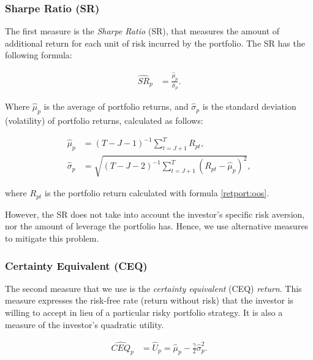 \documentclass[12pt,oneside,a4paper]{memoir}
\begin{document}
\subsubsection*{Sharpe Ratio (SR)} 

The first measure is the \textit{Sharpe Ratio} (SR), that measures the amount of additional return for each unit of risk incurred by the portfolio. The SR has the following formula:

\vspace{-18 pt}
\begin{align*} \label{SR}
	\hat{SR}_p &= \frac{\hat{\mu}_{p}}{\hat{\sigma}_{p}}.
\end{align*}

\noindent
Where $\hat{\mu}_{p}$ is the average of portfolio returns, and $\hat{\sigma}_{p}$ is the standard deviation (volatility) of portfolio returns, calculated as follows:

\vspace{-18 pt}
\begin{align*}
\hat{\mu}_{p} &= (T-J-1)^{-1}\sum_{t=J+1}^{T}R_{pt},
\\
\hat{\sigma}_{p} &= \sqrt{(T-J-2)^{-1}\sum_{t=J+1}^{T}(R_{pt} - \hat{\mu}_{p})^2},
\end{align*}

\noindent
where $R_{pt}$ is the portfolio return calculated with formula \eqref{retport:oos}.

However, the SR does not take into account the investor's specific risk aversion, nor the amount of leverage the portfolio has.  Hence, we use alternative measures to mitigate this problem.

\subsubsection*{Certainty Equivalent (CEQ)} 

The second measure that we use is the \textit{certainty equivalent} (CEQ) \textit{return}. This measure expresses the risk-free rate (return without risk) that the investor is willing to accept in lieu of a particular risky portfolio strategy. It is also a measure of the investor's quadratic utility.

\vspace{-18 pt}
\begin{align*} \label{CEQ}
	\hat{CEQ}_{p} &= \hat{U}_p = \hat{\mu}_{p} - \frac{\gamma}{2} \hat{\sigma}^{2}_{p}.
\end{align*}
\end{document}

